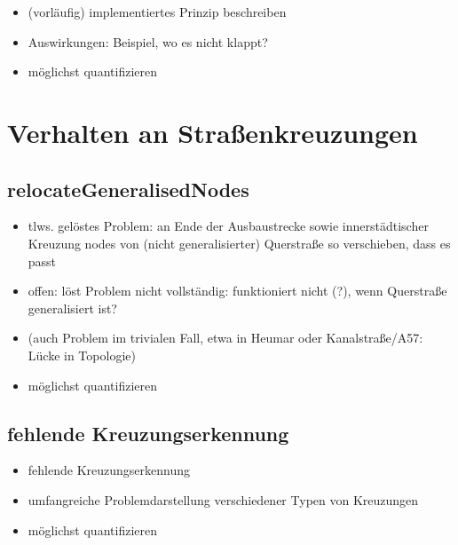 \documentclass[../main/thesis.tex]{subfiles}
\begin{document}
\begin{itemize}
\item (vorläufig) implementiertes Prinzip beschreiben
\item Auswirkungen: Beispiel, wo es nicht klappt?
\item möglichst quantifizieren
\end{itemize}



\section{Verhalten an Straßenkreuzungen}

\subsection{relocateGeneralisedNodes}

\begin{itemize}
\item tlws. gelöstes Problem: an Ende der Ausbaustrecke sowie innerstädtischer Kreuzung nodes von (nicht generalisierter) Querstraße so verschieben, dass es passt
\item offen: löst Problem nicht vollständig: funktioniert nicht (?), wenn Querstraße generalisiert ist?
\item (auch Problem im trivialen Fall, etwa in Heumar oder Kanalstraße/A57: Lücke in Topologie)
\item möglichst quantifizieren
\end{itemize}




\subsection{fehlende Kreuzungserkennung}

\begin{itemize}
\item fehlende Kreuzungserkennung
\item umfangreiche Problemdarstellung verschiedener Typen von Kreuzungen
\item möglichst quantifizieren
\end{itemize}
\end{document}
